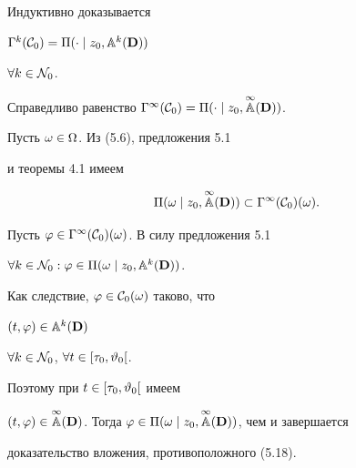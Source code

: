 Индуктивно доказывается


${{\Gm}^k}({\cal C}_0) = {\Pi}(\cdot \mid


{z_0},{{\Bbb A}^k}({\bold D}))$\;


$\forall{k} \in {{\cal N}_0}$.





\begin{thms}


Справедливо равенство ${{\Gm}^\infty}({\cal C}_0) =


{\Pi}(\cdot \mid {z_0},\up{\infty}{\Bbb A}({\bold D}))$.


\end{thms}





\begin{pf}


Пусть $\omega \in \Omega$. Из (5.6), предложения 5.1


и теоремы 4.1 имеем


\begin{equation}


{\Pi}(\omega \mid {z_0},\up{\infty}{\Bbb A}({\bold D})) \subset


{{\Gm}^\infty}({\cal C}_0)(\omega).


\end{equation}


Пусть $\varphi \in {{\Gamma}^\infty}({\cal C}_0)(\omega)$. В силу предложения 5.1


$\fo{k} \in {{\cal N}_0}:\vp \in {\Pi}(\omega \mid


{z_0},{{\Bbb A}^k}({\bold D}))$.


Как следствие, $\varphi \in {{\cal C}_0}(\omega)$ таково, что


$(t,\varphi) \in {{\Bbb A}^k}({\bold D})$\;


$\forall{k} \in {{\cal N}_0}$, $\forall{t} \in [{{\tau}_0},{{\vartheta}_0}[$.


Поэтому при $t \in [{{\tau}_0},{{\vartheta}_0}[$ имеем


$(t,\vp) \in \up{\infty}{\Bbb A}({\bold


D})$. Тогда $\vp \in {\Pi}(\omega \mid


{z_0},\up{\infty}{\Bbb A}({\bold D}))$, чем и завершается


доказательство вложения, противоположного (5.18).


\end{pf}





